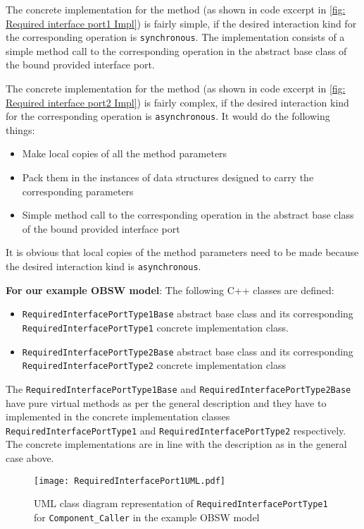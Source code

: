 The concrete implementation for the method (as shown in code excerpt in \cref{fig: Required interface port1 Impl}) is fairly simple, if the desired interaction kind for the corresponding operation is \texttt{synchronous}. The implementation consists of a simple method call to the corresponding operation in the abstract base class of the bound provided interface port.

The concrete implementation for the method (as shown in code excerpt in \cref{fig: Required interface port2 Impl}) is fairly complex, if the desired interaction kind for the corresponding operation is \texttt{asynchronous}. It would do the following things: 
\begin{itemize}
\item Make local copies of all the method parameters
\item Pack them in the instances of data structures designed to carry the corresponding parameters
\item Simple method call to the corresponding operation in the abstract base class of the bound provided interface port
\end{itemize}

It is obvious that local copies of the method parameters need to be made because the desired interaction kind is \texttt{asynchronous}.             

\textbf{For our example OBSW model}: The following C++ classes are defined:
\begin{itemize}
\item \texttt{RequiredInterface\allowbreak PortType1Base} abstract base class and its corresponding \texttt{Required\allowbreak InterfacePort\allowbreak Type1} concrete implementation class.
\item \texttt{RequiredInterface\allowbreak PortType2Base} abstract base class and its corresponding \texttt{Required\allowbreak InterfacePort\allowbreak Type2} concrete implementation class
\end{itemize}

The \texttt{RequiredInterface\allowbreak PortType1Base} and \texttt{RequiredInterface\allowbreak PortType2Base} have pure virtual methods as per the general description and they have to implemented in the concrete implementation classes \texttt{Required\allowbreak InterfacePort\allowbreak Type1} and \texttt{Required\allowbreak InterfacePort\allowbreak Type2} respectively. The concrete implementations are in line with the description as in the general case above.

\begin{figure}[h]
	\centering
	\texttt{[image: RequiredInterfacePort1UML.pdf]}
	\caption{UML class diagram representation of \texttt{Required\allowbreak InterfacePort\allowbreak Type1} for \texttt{Component\allowbreak\_Caller} in the example OBSW model}
	\label{fig: Required interface port1 UML}
\end{figure}

